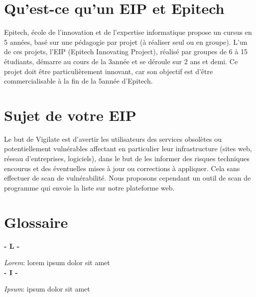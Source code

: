 \section{Qu'est-ce qu’un EIP et Epitech}
Epitech,  école de l'innovation et de l'expertise informatique propose un cursus en 5 années, basé sur une pédagogie par projet (à réaliser seul ou en groupe). L'un de ces projets, l’EIP (Epitech Innovating Project), réalisé par groupes de 6 à 15 étudiants, démarre au cours de la 3\ieme année et se déroule sur 2 ans et demi. Ce  projet doit être particulièrement innovant, car son objectif est d’être commercialisable à la fin de la 5\ieme année d’Epitech.

\section{Sujet de votre EIP}
Le but de Vigilate est d’avertir les utilisateurs des services obsolètes ou potentiellement vulnérables affectant en particulier leur infrastructure (sites web, réseau d'entreprises, logiciels), dans le but de les informer des risques techniques encourus et des éventuelles mises à jour ou corrections à appliquer.
Cela sans effectuer de scan de vulnérabilité.
Nous proposons cependant un outil de scan de programme qui envoie la liste sur notre plateforme web.

\section{Glossaire}
\noindent

\vskip 0.1cm
\textbf{- L -}\\
\vskip 0.1cm

\textit{Lorem}: lorem ipsum dolor sit amet\\

\vskip 0.1cm
\textbf{- I -}\\
\vskip 0.1cm

\textit{Ipsum}: ipsum dolor sit amet\\

